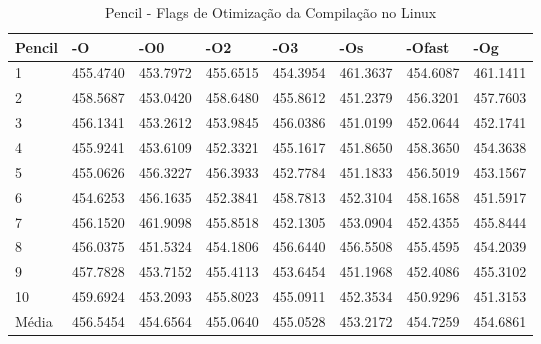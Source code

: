 \begin{table}[!ht]
\tiny
\centering
\caption{Pencil - Flags de Otimização da Compilação no Linux}
\label{tab:otimizacao_compilacao:linux:pencil}
\begin{tabular}{llllllll}
\textbf{Pencil}            & \textbf{-O}  & \textbf{-O0}   & \textbf{-O2} & \textbf{-O3} & \textbf{-Os} & \textbf{-Ofast} & \textbf{-Og} \\ \toprule
1                          & 455.4740     &   453.7972     &  455.6515    &   454.3954   &   461.3637   &   454.6087      &   461.1411       \\ 
2                          & 458.5687     &   453.0420     &  458.6480    &   455.8612   &   451.2379   &   456.3201      &   457.7603       \\ 
3                          & 456.1341     &   453.2612     &  453.9845    &   456.0386   &   451.0199   &   452.0644      &   452.1741       \\ 
4                          & 455.9241     &   453.6109     &  452.3321    &   455.1617   &   451.8650   &   458.3650      &   454.3638       \\ 
5                          & 455.0626     &   456.3227     &  456.3933    &   452.7784   &   451.1833   &   456.5019      &   453.1567       \\ 
6                          & 454.6253     &   456.1635     &  452.3841    &   458.7813   &   452.3104   &   458.1658      &   451.5917       \\ 
7                          & 456.1520     &   461.9098     &  455.8518    &   452.1305   &   453.0904   &   452.4355      &   455.8444       \\ 
8                          & 456.0375     &   451.5324     &  454.1806    &   456.6440   &   456.5508   &   455.4595      &   454.2039       \\ 
9                          & 457.7828     &   453.7152     &  455.4113    &   453.6454   &   451.1968   &   452.4086      &   455.3102       \\ 
10                         & 459.6924     &   453.2093     &  455.8023    &   455.0911   &   452.3534   &   450.9296      &   451.3153       \\ \bottomrule
Média                      & 456.5454     &   454.6564     &  455.0640    &   455.0528   &   453.2172   &   454.7259      &   454.6861       \\ 
\end{tabular}
\end{table}


